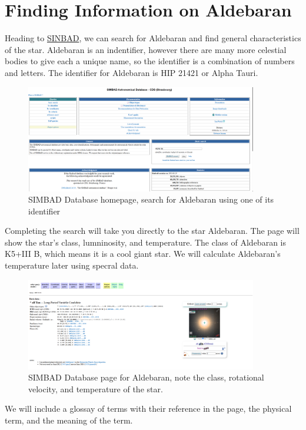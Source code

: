 \documentclass[12pt,oneside,a4paper,english]{article}
\begin{document}
\section{Finding Information on Aldebaran}
Heading to \href{https://simbad.cds.unistra.fr/simbad/}{SINBAD}, we can search for Aldebaran and find general characteristics of the star. Aldebaran is an indentifier, however there are many more celestial bodies to give each a unique name, so the identifier is a combination of numbers and letters. The identifier for Aldebaran is HIP 21421 or Alpha Tauri.
\begin{figure}[H]
    \centering
    \includegraphics[width=0.9\textwidth]{SINBAD1.png}
    \caption{SIMBAD Database homepage, search for Aldebaran using one of its identifier \cite{simbad}}
\end{figure}
Completing the search will take you directly to the star Aldebaran. The page will show the star's class, lumninosity, and temperature. The class of Aldebaran is K5+III B, which means it is a cool giant star. We will calculate Aldebaran's temperature later using specral data.
\begin{figure}[H]
    \centering
    \includegraphics[width=0.9\textwidth]{SINBAD2.png}
    \caption{SIMBAD Database page for Aldebaran, note the class, rotational velocity, and temperature of the star.\cite{simbad}}
\end{figure}
We will include a glossay of terms with their reference in the page, the physical term, and the meaning of the term. 
\end{document}
